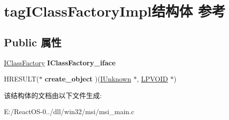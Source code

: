 \hypertarget{structtag_i_class_factory_impl}{}\section{tag\+I\+Class\+Factory\+Impl结构体 参考}
\label{structtag_i_class_factory_impl}
\subsection*{Public 属性}
\begin{DoxyCompactItemize}
\item 
\mbox{\label{structtag_i_class_factory_impl_aab2b722db6ff34afed178adb0d3a45a6}} 
\hyperlink{interface_i_class_factory}{I\+Class\+Factory} {\bfseries I\+Class\+Factory\+\_\+iface}
\item 
\mbox{\label{structtag_i_class_factory_impl_a3b37fd102cc9d51a4bee293db4b13112}} 
H\+R\+E\+S\+U\+LT($\ast$ {\bfseries create\+\_\+object} )(\hyperlink{interface_i_unknown}{I\+Unknown} $\ast$, \hyperlink{interfacevoid}{L\+P\+V\+O\+ID} $\ast$)
\end{DoxyCompactItemize}


该结构体的文档由以下文件生成\+:\begin{DoxyCompactItemize}
\item 
E\+:/\+React\+O\+S-\/0../dll/win32/msi/msi\+\_\+main.\+c\end{DoxyCompactItemize}
